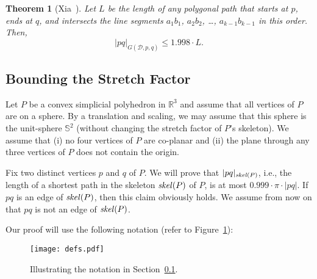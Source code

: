 \documentclass[12pt]{article}
\newtheorem{theorem}{Theorem}
\newcommand{\IR}{\mathbb{R}}
\newcommand{\IS}{\mathbb{S}}
\newcommand{\skel}{\mathord{\it skel}}
\begin{document}
\begin{theorem}[Xia~\cite{x-sfdtl-13}]   \label{thmxia} 
Let $L$ be the length of any polygonal path that starts at $p$, ends at 
$q$, and intersects the line segments 
$a_1 b_1$, $a_2 b_2$, \ldots , $a_{k-1} b_{k-1}$ in this order. Then, 
\[ |pq|_{G(\mathcal{D},p,q)} \leq 1.998 \cdot L . 
\]  
\end{theorem} 


\subsection{Bounding the Stretch Factor}  \label{subsecSFCP} 
Let $P$ be a convex simplicial polyhedron in $\IR^3$ and assume that 
all vertices of $P$ are on a sphere. By a translation and scaling, we 
may assume that this sphere is the unit-sphere $\IS^2$ (without changing 
the stretch factor of $P$'s skeleton). We assume that 
(i) no four vertices of $P$ are co-planar and (ii) the plane through 
any three vertices of $P$ does not contain the origin. 

Fix two distinct vertices $p$ and $q$ of $P$. We will prove that 
$|pq|_{\skel(P)}$, i.e., the length of a shortest path in the skeleton 
$\skel(P)$ of $P$, is at most $0.999 \cdot \pi \cdot |pq|$. If $pq$ is 
an edge of $\skel(P)$, then this claim obviously holds. We assume from 
now on that $pq$ is not an edge of $\skel(P)$. 

Our proof will use the following notation (refer to 
Figure~\ref{figdefs}): 

\begin{figure}
\begin{center}
\texttt{[image: defs.pdf]}
\end{center}
\caption{Illustrating the notation in Section~\ref{subsecSFCP}.}  
\label{figdefs}
\end{figure}
\end{document}
